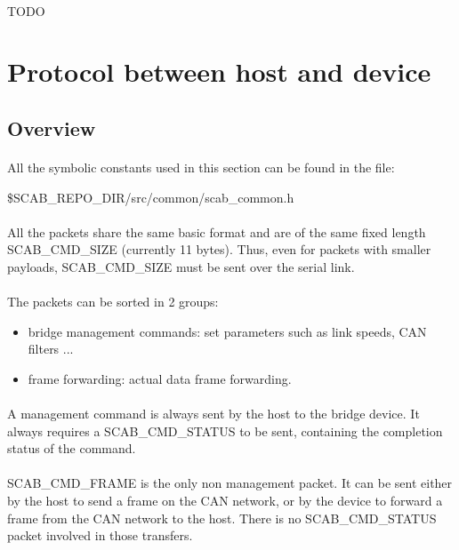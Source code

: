 \documentclass[a4paper, 11pt]{article}
\begin{document}
\paragraph{}
TODO

\newpage
\section{Protocol between host and device}

\subsection{Overview}
\paragraph{}
All the symbolic constants used in this section can be found in the file:
\begin{center}
\$SCAB\_REPO\_DIR/src/common/scab\_common.h
\end{center}

\paragraph{}
All the packets share the same basic format and are of the same fixed length
SCAB\_CMD\_SIZE (currently 11 bytes). Thus, even for packets with smaller
payloads, SCAB\_CMD\_SIZE must be sent over the serial link.

\paragraph{}
The packets can be sorted in 2 groups:
\begin{itemize}
\item bridge management commands: set parameters such as link speeds, CAN filters ...
\item frame forwarding: actual data frame forwarding.
\end{itemize}

\paragraph{}
A management command is always sent by the host to the bridge device. It always
requires a SCAB\_CMD\_STATUS to be sent, containing the completion status of the
command.

\paragraph{}
SCAB\_CMD\_FRAME is the only non management packet. It can be sent either by the
host to send a frame on the CAN network, or by the device to forward a frame from
the CAN network to the host. There is no SCAB\_CMD\_STATUS packet involved in those
transfers.
\end{document}
